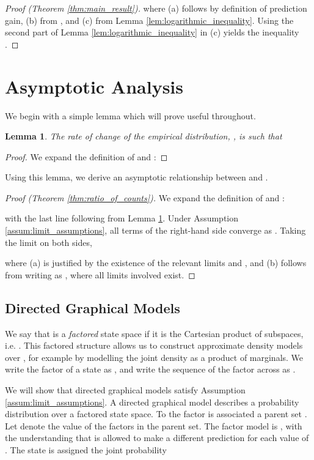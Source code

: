 \documentclass{article}
\newtheorem{lem}{Lemma}
\begin{document}
{\begin{proof}[Proof (Theorem \ref{thm:main_result})]
where (a) follows by definition of prediction gain, (b) from , and (c) from Lemma \ref{lem:logarithmic_inequality}. Using the second part of Lemma \ref{lem:logarithmic_inequality} in (c) yields the inequality .
\end{proof}

\section{Asymptotic Analysis}

We begin with a simple lemma which will prove useful throughout.
\begin{lem}\label{lem:empirical_rate_of_change}
The rate of change of the empirical distribution, , is such that

\end{lem}
\begin{proof}
We expand the definition of  and :

\end{proof}

Using this lemma, we derive an asymptotic relationship between  and . 

\begin{proof}[Proof (Theorem \ref{thm:ratio_of_counts})]
We expand the definition of  and : 

with the last line following from Lemma \ref{lem:empirical_rate_of_change}. Under Assumption \ref{assum:limit_assumptions}, all terms of the right-hand side converge as . Taking the limit on both sides,

where (a) is justified by the existence of the relevant limits and , and (b) follows 
from writing  as , where all limits involved
exist. 
\end{proof}

\subsection{Directed Graphical Models}

We say that  is a \emph{factored} state space if it is the Cartesian product of  subspaces, i.e. . This factored structure allows us to construct approximate density models over , for example by modelling the joint density as a product of marginals.
We write the  factor of a state  as , and write the sequence of the  factor across  as . 

We will show that directed graphical models \citep{wainwright08graphical} satisfy Assumption 
\ref{assum:limit_assumptions}.
A directed graphical model describes a probability distribution over a factored state space. To the  factor  is associated a parent set . Let  denote the value of the factors in the parent set. The  factor model
is , with the understanding 
that  is allowed to make a different prediction for each value of . The state  
is assigned the joint probability 

}
\end{document}

